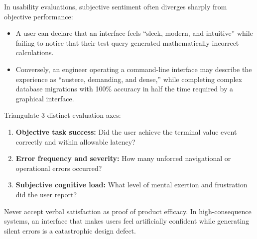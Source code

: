 In usability evaluations, subjective sentiment often diverges sharply from objective performance:
\begin{itemize}
    \item A user can declare that an interface feels ``sleek, modern, and intuitive'' while failing to notice that their test query generated mathematically incorrect calculations.
    \item Conversely, an engineer operating a command-line interface may describe the experience as ``austere, demanding, and dense,'' while completing complex database migrations with 100\% accuracy in half the time required by a graphical interface.
\end{itemize}

Triangulate 3 distinct evaluation axes:
\begin{enumerate}
    \item \textbf{Objective task success:} Did the user achieve the terminal value event correctly and within allowable latency?
    \item \textbf{Error frequency and severity:} How many unforced navigational or operational errors occurred?
    \item \textbf{Subjective cognitive load:} What level of mental exertion and frustration did the user report?
\end{enumerate}

Never accept verbal satisfaction as proof of product efficacy. In high-consequence systems, an interface that makes users feel artificially confident while generating silent errors is a catastrophic design defect.
